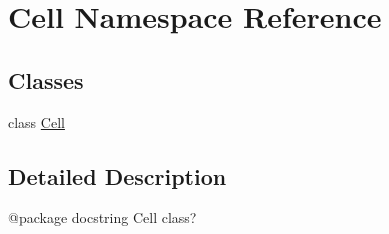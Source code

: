 \hypertarget{namespace_cell}{}\section{Cell Namespace Reference}
\label{namespace_cell}
\subsection*{Classes}
\begin{DoxyCompactItemize}
\item 
class \hyperlink{class_cell_1_1_cell}{Cell}
\end{DoxyCompactItemize}


\subsection{Detailed Description}
\begin{DoxyVerb}@package docstring
   Cell class?
\end{DoxyVerb}
 